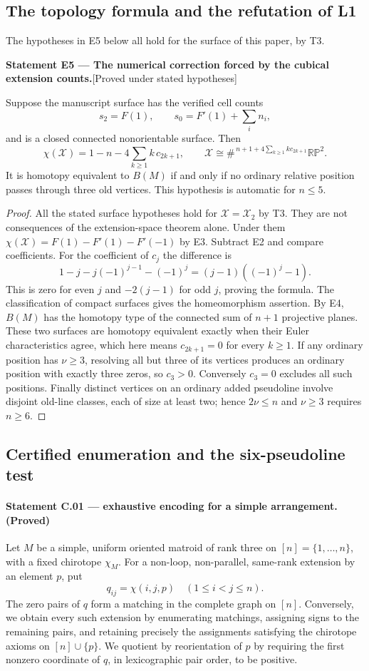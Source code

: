 \documentclass[11pt,a4paper]{article}
\newenvironment{resultenv}[3]{\par\medskip\phantomsection\label{#1}\noindent\textbf{Statement #1 --- #3.}\quad\textsf{[#2]}\par\smallskip\noindent\ignorespaces}{\par\medskip}
\begin{document}
\subsection{The topology formula and the refutation of L1}
The hypotheses in E5 below all hold for the surface of this paper, by T3.
\begin{resultenv}{E5}{Proved under stated hypotheses}{The numerical correction forced by the cubical extension counts}
Suppose the manuscript surface has the verified cell counts
\[
 s_2=F(1),\qquad s_0=F'(1)+\sum_i n_i,
\]
and is a closed connected nonorientable surface. Then
\[
 \chi(\mathcal X)
 =1-n-4\sum_{k\geq1}k\,c_{2k+1},
 \qquad
 \mathcal X\cong\#^{\,n+1+4\sum_{k\geq1}k c_{2k+1}}\mathbb {RP}^2.
\]
It is homotopy equivalent to $B(M)$ if and only if no ordinary relative
position passes through three old vertices. This hypothesis is automatic
for $n\leq5$.
\end{resultenv}
\begin{proof}
All the stated surface hypotheses hold for $\mathcal X=\mathcal X_2$ by
T3. They are not consequences of the extension-space theorem alone.
Under them $\chi(\mathcal X)=F(1)-F'(1)-F'(-1)$ by E3. Subtract E2 and
compare coefficients. For the coefficient of $c_j$ the difference is
\[
 1-j-j(-1)^{j-1}-(-1)^j=(j-1)((-1)^j-1).
\]
This is zero for even $j$ and $-2(j-1)$ for odd $j$, proving the formula.
The classification of compact surfaces gives the homeomorphism assertion.
By E4, $B(M)$ has the homotopy type of the connected sum of $n+1$ projective
planes. These two surfaces are homotopy equivalent exactly when their Euler
characteristics agree, which here means $c_{2k+1}=0$ for every $k\geq1$.
If any ordinary position has $\nu\geq3$, resolving all but three of its
vertices produces an ordinary position with exactly three zeros, so $c_3>0$.
Conversely $c_3=0$ excludes all such positions. Finally distinct vertices on
an ordinary added pseudoline involve disjoint old-line classes, each of size
at least two; hence $2\nu\leq n$ and $\nu\geq3$ requires $n\geq6$.
\end{proof}

\subsection{Certified enumeration and the six-pseudoline test}
\label{sec:counts}

\paragraph{Statement C.01 --- exhaustive encoding for a simple arrangement. (Proved)}\label{C.01}
Let $M$ be a simple, uniform oriented matroid of rank three on
$[n]=\{1,\ldots,n\}$, with a fixed chirotope $\chi_M$.
For a non-loop, non-parallel, same-rank extension by an element $p$, put
\[
 q_{ij}=\chi(i,j,p)\quad (1\leq i<j\leq n).
\]
The zero pairs of $q$ form a matching in the complete graph on $[n]$.
Conversely, we obtain every such extension by enumerating matchings,
assigning signs to the remaining pairs, and retaining precisely the
assignments satisfying the chirotope axioms on $[n]\cup\{p\}$.
We quotient by reorientation of $p$ by requiring the first nonzero
coordinate of $q$, in lexicographic pair order, to be positive.
\end{document}
